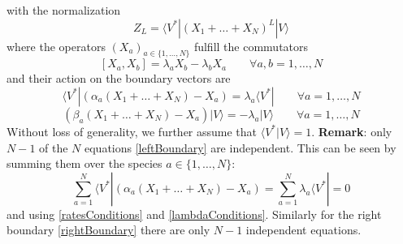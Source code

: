 \documentclass[10pt]{article}
\numberwithin{equation}{section}
\numberwithin{equation}{subsection}
\begin{document}
with the normalization 
\begin{equation}
	Z_{L}=\langle V^{*}|(X_{1}+\ldots +X_{N})^{L}|V\rangle
\end{equation}
where the operators $(X_{a})_{a\in \{1,\ldots,N\}}$ fulfill the commutators
\begin{equation}\label{bulk}
	\left[X_{a},X_{b}\right]=\lambda_{a}X_{b}-\lambda_{b}X_{a}\qquad\forall a,b=1,\ldots,N
\end{equation}
and their action on the boundary vectors are
\begin{equation}\label{leftBoundary}
	\langle V^{*}|\left(\alpha_{a}(X_{1}+\ldots+X_{N})-X_{a}\right)=\lambda_{a}\langle V^{*}|\qquad\forall a=1,\ldots,N
\end{equation}
\begin{equation}\label{rightBoundary}
	\left(\beta_{a}(X_{1}+\ldots+X_{N})-X_{a}\right)|V\rangle=-\lambda_{a}|V\rangle\qquad\forall a=1,\ldots,N
\end{equation}
Without loss of generality, we further assume that $\langle V^{*}|V\rangle=1$. 
\newline \newline
\textbf{Remark}: only $N-1$ of the $N$ equations \eqref{leftBoundary}  are independent. This can be seen by summing them over the species $a\in \{1,\ldots,N\}$:
	\begin{equation}
		\sum_{a=1}^{N}	\langle V^{*}|\left(\alpha_{a}(X_{1}+\ldots+X_{N})-X_{a}\right)=\sum_{a=1}^{N}\lambda_{a}\langle V^{*}|=0
	\end{equation}
	and using  \eqref{ratesConditions} and \eqref{lambdaConditions}.
 Similarly for the right boundary  \eqref{rightBoundary} there are only  $N-1$ independent equations.
\end{document}
